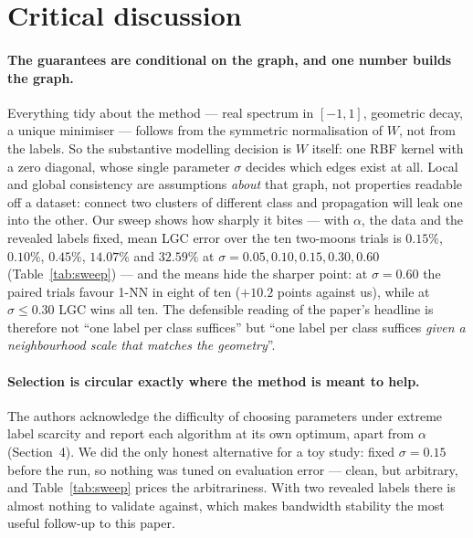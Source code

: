 \section{Critical discussion}\label{sec:critique}

\paragraph{The guarantees are conditional on the graph, and one number builds the graph.}
Everything tidy about the method --- real spectrum in $[-1,1]$, geometric decay,
a unique minimiser --- follows from the symmetric normalisation of $W$, not from
the labels. So the substantive modelling decision is $W$ itself: one RBF kernel
with a zero diagonal, whose single parameter $\sigma$ decides which edges exist
at all. Local and global consistency are assumptions \emph{about} that graph,
not properties readable off a dataset: connect two clusters of different class
and propagation will leak one into the other. Our sweep shows how sharply it
bites --- with $\alpha$, the data and the revealed labels fixed, mean LGC error
over the ten two-moons trials is $0.15\%$, $0.10\%$, $0.45\%$, $14.07\%$ and
$32.59\%$ at $\sigma=0.05,0.10,0.15,0.30,0.60$ (Table~\ref{tab:sweep}) --- and
the means hide the sharper point: at $\sigma=0.60$ the paired trials favour 1-NN
in eight of ten ($+10.2$ points against us), while at $\sigma\le0.30$ LGC wins
all ten. The defensible reading of the paper's headline is therefore not ``one
label per class suffices'' but ``one label per class suffices \emph{given a
neighbourhood scale that matches the geometry}''.

\paragraph{Selection is circular exactly where the method is meant to help.}
The authors acknowledge the difficulty of choosing parameters under extreme label
scarcity and report each algorithm at its own optimum, apart from $\alpha$
(Section~4). We did the only honest alternative for a toy study: fixed
$\sigma=0.15$ before the run, so nothing was tuned on evaluation error --- clean,
but arbitrary, and Table~\ref{tab:sweep} prices the arbitrariness. With two
revealed labels there is almost nothing to validate against, which makes
bandwidth stability the most useful follow-up to this paper.


